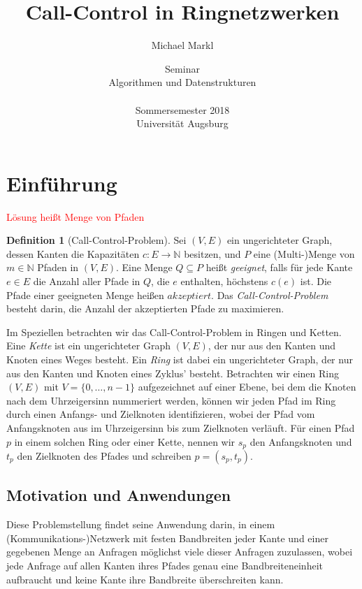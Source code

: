 \documentclass[11pt]{article}
\title{\bfseries Call-Control in Ringnetzwerken}
\author{Michael Markl}
\date{Seminar\\ \glqq Algorithmen und Datenstrukturen\grqq\\~ \\Sommersemester 2018\\ Universität Augsburg}
\theoremstyle{definition}
\newtheorem{definition}{Definition}[section]
\theoremstyle{theorem}
\theoremstyle{theorem}
\newcommand\todo[1]{\textcolor{red}{#1}}
\begin{document}
    \maketitle


    \section{Einführung}\label{sec:einführung}

    \todo{Lösung heißt Menge von Pfaden}

    \begin{definition}[Call-Control-Problem]
        Sei $(V,E)$ ein ungerichteter Graph, dessen Kanten die Kapazitäten $c: E \to \mathbb{N}$ besitzen, und $P$ eine
        (Multi-)Menge von $m \in \mathbb{N}$ Pfaden in $(V,E)$.
        Eine Menge $Q \subseteq P$ heißt {\em geeignet}, falls für jede Kante $e \in E$ die Anzahl aller Pfade in $Q$,
        die $e$ enthalten, höchstens $c(e)$ ist.
        Die Pfade einer geeigneten Menge heißen $akzeptiert$.
        Das {\em Call-Control-Problem} besteht darin, die Anzahl der akzeptierten Pfade zu maximieren.
    \end{definition}

    Im Speziellen betrachten wir das Call-Control-Problem in Ringen und Ketten.
    Eine {\em Kette} ist ein ungerichteter Graph $(V,E)$, der nur aus den Kanten und Knoten eines Weges besteht.
    Ein {\em Ring} ist dabei ein ungerichteter Graph, der nur aus den Kanten und Knoten eines Zyklus' besteht.
    Betrachten wir einen Ring $(V,E)$ mit $V=\{0, \dots , n-1\}$ aufgezeichnet auf einer Ebene, bei dem die Knoten nach
    dem Uhrzeigersinn nummeriert werden, können wir jeden Pfad im Ring durch einen Anfangs- und Zielknoten identifizieren,
    wobei der Pfad vom Anfangsknoten aus im Uhrzeigersinn bis zum Zielknoten \glqq verläuft\grqq.
    Für einen Pfad $p$ in einem solchen Ring oder einer Kette, nennen wir $s_p$ den
    Anfangsknoten und $t_p$ den Zielknoten des Pfades und schreiben $p=(s_p, t_p)$.


    \subsection{Motivation und Anwendungen}\label{subsec:motivationUndAnwendungen}
    Diese Problemstellung findet seine Anwendung darin, in einem (Kommunikations-)Netzwerk mit festen Bandbreiten jeder
    Kante und einer gegebenen Menge an Anfragen möglichst viele dieser Anfragen zuzulassen, wobei jede Anfrage auf allen
    Kanten ihres Pfades genau eine Bandbreiteneinheit aufbraucht und keine Kante ihre Bandbreite überschreiten kann.
\end{document}
